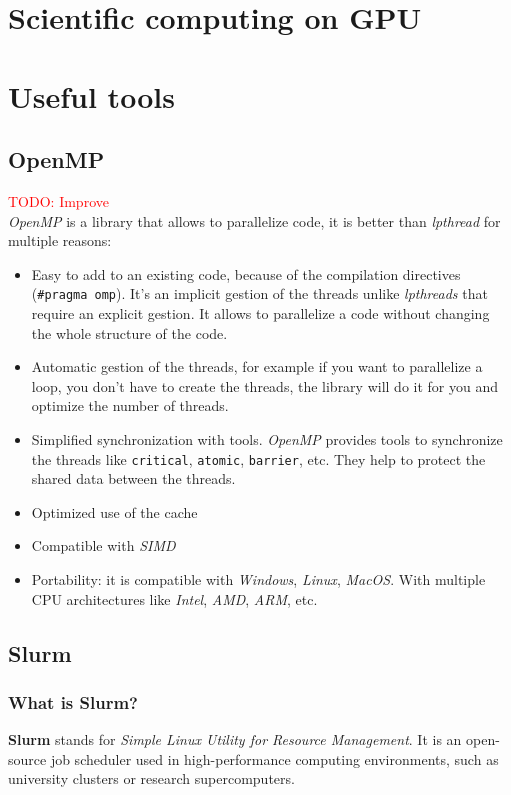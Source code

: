 \documentclass[12pt, openany]{report}
\theoremstyle{definition}
\begin{document}
\chapter{Scientific computing on GPU}
\chapter{Useful tools}
\section{OpenMP}\label{OpenMP}
\textcolor{red}{TODO: Improve}\\
\textit{OpenMP} is a library that allows to parallelize code, it is better than \textit{lpthread} for multiple reasons:
\begin{itemize}
	\item Easy to add to an existing code, because of the compilation directives (\texttt{\#pragma omp}). It's an implicit gestion of the threads unlike \textit{lpthreads} that require an explicit gestion. It allows to parallelize a code without changing the whole structure of the code.
	\item Automatic gestion of the threads, for example if you want to parallelize a loop, you don't have to create the threads, the library will do it for you and optimize the number of threads.
	\item Simplified synchronization with tools. \textit{OpenMP} provides tools to synchronize the threads like \texttt{critical}, \texttt{atomic}, \texttt{barrier}, etc. They help to protect the shared data between the threads.
	\item Optimized use of the cache
	\item Compatible with \textit{SIMD}
	\item Portability: it is compatible with \textit{Windows}, \textit{Linux}, \textit{MacOS}. With multiple CPU architectures like \textit{Intel}, \textit{AMD}, \textit{ARM}, etc.
\end{itemize}
\section{Slurm}
\subsection{What is Slurm?}
\textbf{Slurm} stands for \textit{Simple Linux Utility for Resource Management}. It is an open-source job scheduler used in high-performance computing environments, such as university clusters or research supercomputers.
\end{document}
